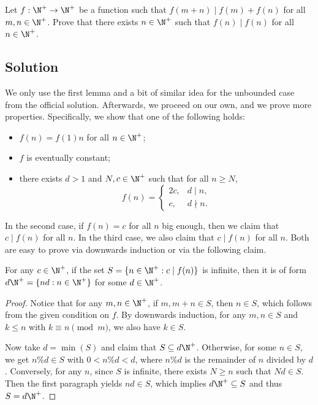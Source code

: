 Let $f : \N^+ \to \N^+$ be a function such that $f(m + n) \mid f(m) + f(n)$ for all $m, n \in \N^+$.
Prove that there exists $n \in \N^+$ such that $f(n) \mid f(n)$ for all $n \in \N^+$.



\subsection*{Solution}

We only use the first lemma and a bit of similar idea for the unbounded case from the official solution.
Afterwards, we proceed on our own, and we prove more properties.
Specifically, we show that one of the following holds:
\begin{itemize}
    \item   $f(n) = f(1) n$ for all $n \in \N^+$;
    \item   $f$ is eventually constant;
    \item   there exists $d > 1$ and $N, c \in \N^+$ such that for all $n \geq N$,
            \[ f(n) = \begin{cases} 2c, & d \mid n, \\ c, & d \nmid n. \end{cases} \]
\end{itemize}
In the second case, if $f(n) = c$ for all $n$ big enough, then we claim that $c \mid f(n)$ for all $n$.
In the third case, we also claim that $c \mid f(n)$ for all $n$.
Both are easy to prove via downwards induction or via the following claim.

\begin{claim}
For any $c \in \N^+$, if the set $S = \{n \in \N^+ : c \mid f(n)\}$ is infinite, then it is of form $d \N^+ = \{nd : n \in \N^+\}$ for some $d \in \N^+$. 
\end{claim}
\begin{proof}
Notice that for any $m, n \in \N^+$, if $m, m + n \in S$, then $n \in S$, which follows from the given condition on $f$.
By downwards induction, for any $m, n \in S$ and $k \leq n$ with $k \equiv n \pmod{m}$, we also have $k \in S$.

Now take $d = \min(S)$ and claim that $S \subseteq d \N^+$.
Otherwise, for some $n \in S$, we get $n \% d \in S$ with $0 < n \% d < d$, where $n \% d$ is the remainder of $n$ divided by $d$.
Conversely, for any $n$, since $S$ is infinite, there exists $N \geq n$ such that $Nd \in S$.
Then the first paragraph yields $nd \in S$, which implies $d \N^+ \subseteq S$ and thus $S = d \N^+$.
\end{proof}

